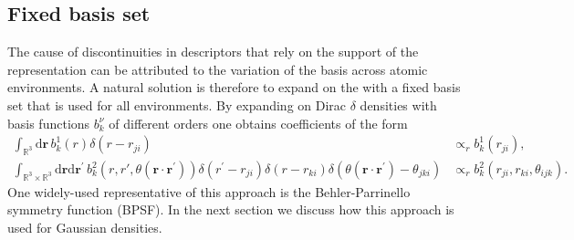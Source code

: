 %
%

\subsection{Fixed basis set}
The cause of discontinuities in descriptors that rely on the support of the representation can be attributed to the variation of the basis across atomic environments.
A natural solution is therefore to expand on the with a fixed basis set that is used for all environments\cite{behler2011atom,bartok2013representing,drautz2019atomic}.
By expanding on Dirac $\delta$ densities with basis functions $b^\nu_k$ of different orders one obtains coefficients of the form
\begin{subequations}
\label{eq:dirac_delta_expansion_coeffs}
\begin{align}
    \label{eq:dirac_delta_expansion_coeffs_2body}
    \int_{\mathbb{R}^3}\mathrm{d}\mathbf{r}\, b^1_k(r)\delta(r-r_{ji}) &\propto_r b^1_k(r_{ji}),\\
    \label{eq:dirac_delta_expansion_coeffs_3body}
    \int_{\mathbb{R}^3\times\mathbb{R}^3}\mathrm{d}\mathbf{r}\mathrm{d}\mathbf{r}^\prime\, b^2_k(r,r\prime,\theta(\mathbf{r}\cdot\mathbf{r}^\prime))\delta(r^\prime-r_{ji})\delta(r-r_{ki})
    \delta(\theta(\mathbf{r}\cdot\mathbf{r}^\prime) - \theta_{jki}) &\propto_r b^2_k(r_{ji},r_{ki},\theta_{ijk}).
\end{align}
\end{subequations}
One widely-used representative of this approach is the Behler-Parrinello symmetry function (BPSF)\cite{behl11jcp}.
In the next section we discuss how this approach is used for Gaussian densities. 

